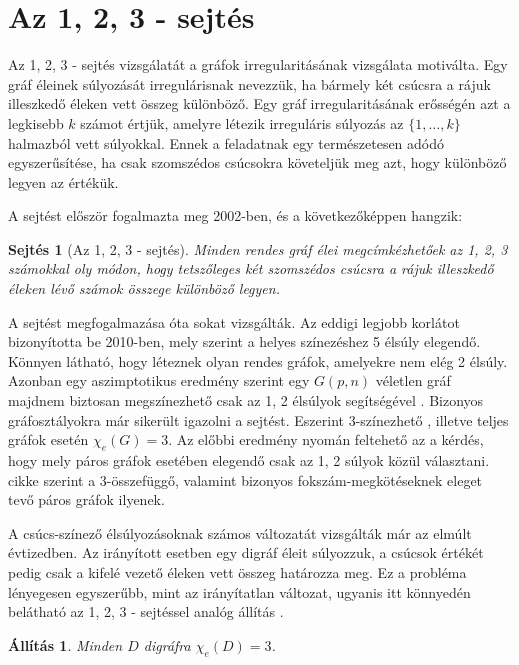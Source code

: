 \documentclass[12pt, a4paper]{report}
\newtheorem{áll}[tét]{Állítás}
\newtheorem{sej}[tét]{Sejtés}
\theoremstyle{remark}
\theoremstyle{definition}
\begin{document}
\section{Az 1, 2, 3 - sejtés}
Az 1, 2, 3 - sejtés vizsgálatát a gráfok irregularitásának vizsgálata motiválta. Egy gráf éleinek súlyozását irregulárisnak nevezzük, ha bármely két csúcsra a rájuk illeszkedő éleken vett összeg különböző. Egy gráf irregularitásának erősségén azt a legkisebb $k$ számot értjük, amelyre létezik irreguláris súlyozás az $\lbrace 1, \ldots, k \rbrace$ halmazból vett súlyokkal. Ennek a feladatnak egy természetesen adódó egyszerűsítése, ha csak szomszédos csúcsokra követeljük meg azt, hogy különböző legyen az értékük. 

A sejtést először \citeauthor{Karonski2004} \cite{Karonski2004} fogalmazta meg 2002-ben, és a következőképpen hangzik: 

\begin{sej}[Az 1, 2, 3 - sejtés]
Minden rendes gráf élei megcímkézhetőek az 1, 2, 3 számokkal oly módon, hogy tetszőleges két szomszédos csúcsra a rájuk illeszkedő éleken lévő számok összege különböző legyen.
\end{sej}

A sejtést megfogalmazása óta sokat vizsgálták. Az eddigi legjobb korlátot \citeauthor{Kalkowski2010} \cite{Kalkowski2010} bizonyította be 2010-ben, mely szerint a helyes színezéshez 5 élsúly elegendő. Könnyen látható, hogy léteznek olyan rendes gráfok, amelyekre nem elég 2 élsúly. Azonban egy aszimptotikus eredmény szerint egy $G(p, n)$ véletlen gráf majdnem biztosan megszínezhető csak az 1, 2 élsúlyok segítségével \cite{AddarioBerry2008}. Bizonyos gráfosztályokra már sikerült igazolni a sejtést. Eszerint 3-színezhető \cite{Karonski2004}, illetve teljes gráfok \cite{Alaeiyan2012} esetén $\chi_e(G) = 3$. Az előbbi eredmény nyomán feltehető az a kérdés, hogy mely páros gráfok esetében elegendő csak az 1, 2 súlyok közül választani. \citeauthor{Lu2011} \cite{Lu2011} cikke szerint a 3-összefüggő, valamint bizonyos fokszám-megkötéseknek eleget tevő páros gráfok ilyenek.

A csúcs-színező élsúlyozásoknak számos változatát vizsgálták már az elmúlt évtizedben. Az irányított esetben egy digráf éleit súlyozzuk, a csúcsok értékét pedig csak a kifelé vezető éleken vett összeg határozza meg. Ez a probléma lényegesen egyszerűbb, mint az irányítatlan változat, ugyanis itt könnyedén belátható az 1, 2, 3 - sejtéssel analóg állítás \cite{Baudon2014}.

\begin{áll}
Minden $D$ digráfra $\chi_e(D) = 3$.
\end{áll}
\end{document}
